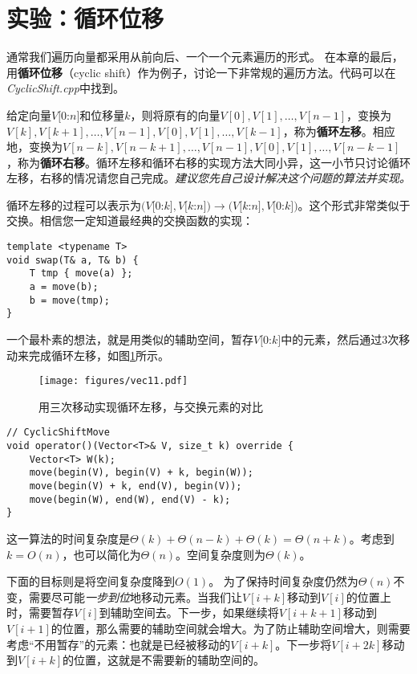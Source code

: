 \section{实验：循环位移}

通常我们遍历向量都采用从前向后、一个一个元素遍历的形式。
在本章的最后，用\textbf{循环位移}（cyclic shift）作为例子，讨论一下非常规的遍历方法。代码可以在\textit{CyclicShift.cpp}中找到。

给定向量$V[0$:$n]$和位移量$k$，则将原有的向量$V[0],V[1],\dots,V[n-1]$，变换为$V[k],V[k+1],\dots,V[n-1],V[0],V[1],\dots,V[k-1]$，称为\textbf{循环左移}。相应地，变换为$V[n-k],V[n-k+1],\dots,V[n-1],V[0],V[1],\dots,V[n-k-1]$，称为\textbf{循环右移}。循环左移和循环右移的实现方法大同小异，这一小节只讨论循环左移，右移的情况请您自己完成。\textit{建议您先自己设计解决这个问题的算法并实现。}

循环左移的过程可以表示为$(V[0$:$k],V[k$:$n])\to (V[k$:$n],V[0$:$k])$。这个形式非常类似于交换。相信您一定知道最经典的交换函数的实现：
\begin{lstlisting}
template <typename T>
void swap(T& a, T& b) {
    T tmp { move(a) };
    a = move(b);
    b = move(tmp);
}
\end{lstlisting}

一个最朴素的想法，就是用类似的辅助空间，暂存$V[0$:$k]$中的元素，然后通过3次移动来完成循环左移，如图\ref{fig:vec11}所示。

\begin{figure}[H]
  \centering
  \texttt{[image: figures/vec11.pdf]}
  \caption{用三次移动实现循环左移，与交换元素的对比}
  \label{fig:vec11}
\end{figure}

\begin{lstlisting}
// CyclicShiftMove
void operator()(Vector<T>& V, size_t k) override {
    Vector<T> W(k);
    move(begin(V), begin(V) + k, begin(W));
    move(begin(V) + k, end(V), begin(V));
    move(begin(W), end(W), end(V) - k);
}
\end{lstlisting}

这一算法的时间复杂度是$\Theta(k)+\Theta(n-k)+\Theta(k)=\Theta(n+k)$。考虑到$k=O(n)$，也可以简化为$\Theta(n)$。空间复杂度则为$\Theta(k)$。

下面的目标则是将空间复杂度降到$O(1)$。
为了保持时间复杂度仍然为$\Theta(n)$不变，需要尽可能\textit{一步到位}地移动元素。当我们让$V[i+k]$移动到$V[i]$的位置上时，需要暂存$V[i]$到辅助空间去。下一步，如果继续将$V[i+k+1]$移动到$V[i+1]$的位置，那么需要的辅助空间就会增大。为了防止辅助空间增大，则需要考虑“不用暂存”的元素：也就是已经被移动的$V[i+k]$。下一步将$V[i+2k]$移动到$V[i+k]$的位置，这就是不需要新的辅助空间的。

